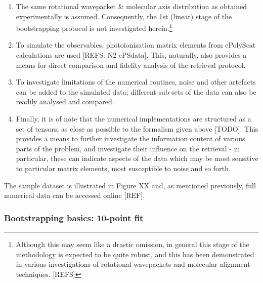 \begin{enumerate}
\item The same rotational wavepacket \& molecular axis distribution as obtained experimentally is assumed. Consequently, the 1st (linear) stage of the bootstrapping protocol is not investigated herein.\footnote{Although this may seem like a drastic omission, in general this stage of the methodology is expected to be quite robust, and this has been demonstrated in various investigations of rotational wavepackets and molecular alignment techniques. [REFS]}
\item To simulate the observables, photoionization matrix elements from ePolyScat \cite{Gianturco1994,Natalense1999} calculations are used [REFS: N2 ePSdata]. This, naturally, also provides a means for direct comparison and fidelity analysis of the retrieval protocol.
\item To investigate limitations of the numerical routines, noise and other artefacts can be added to the simulated data; different sub-sets of the data can also be readily analysed and compared.
\item Finally, it is of note that the numerical implementations are structured as a set of tensors, as close as possible to the formalism given above [TODO]. This provides a means to further investigate the information content of various parts of the problem, and investigate their influence on the retrieval - in particular, these can indicate aspects of the data which may be most sensitive to particular matrix elements, most susceptible to noise and so forth.
\end{enumerate}

The sample dataset is illustrated in Figure XX and, as mentioned previously, full numerical data can be accessed online [REF].

\subsubsection{Bootstrapping basics: 10-point fit}

